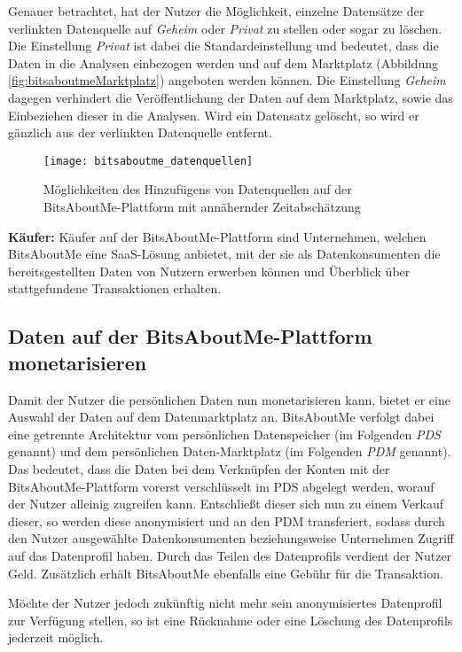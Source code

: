 \noindent Genauer betrachtet, hat der Nutzer die Möglichkeit, einzelne Datensätze der verlinkten Datenquelle auf \textit{Geheim} oder \textit{Privat} zu stellen oder sogar zu löschen. Die Einstellung \textit{Privat} ist dabei die Standardeinstellung und bedeutet, dass die Daten in die Analysen einbezogen werden und auf dem Marktplatz (Abbildung \ref{fig:bitsaboutmeMarktplatz}) angeboten werden können. Die Einstellung \textit{Geheim} dagegen verhindert die Veröffentlichung der Daten auf dem Marktplatz, sowie das Einbeziehen dieser in die Analysen. Wird ein Datensatz gelöscht, so wird er gänzlich aus der verlinkten Datenquelle entfernt.

\begin{figure}[!ht]
	\centering
	\texttt{[image: bitsaboutme\_datenquellen]}
	\caption{Möglichkeiten des Hinzufügens von Datenquellen auf der BitsAboutMe-Plattform mit annähernder Zeitabschätzung}
	\label{fig:bitsaboutmeDatenquellen}
\end{figure}
\FloatBarrier

\noindent \textbf{Käufer:} Käufer auf der BitsAboutMe-Plattform sind Unternehmen, welchen BitsAboutMe eine SaaS-Lösung anbietet, mit der sie als Datenkonsumenten die bereitsgestellten Daten von Nutzern erwerben können und Überblick über stattgefundene Transaktionen erhalten.

\subsection{Daten auf der BitsAboutMe-Plattform monetarisieren}
Damit der Nutzer die persönlichen Daten nun monetarisieren kann, bietet er eine Auswahl der Daten auf dem Datenmarktplatz an. BitsAboutMe verfolgt dabei eine getrennte Architektur vom persönlichen Datenspeicher (im Folgenden \textit{PDS} genannt) und dem persönlichen Daten-Marktplatz (im Folgenden \textit{PDM} genannt). Das bedeutet, dass die Daten bei dem Verknüpfen der Konten mit der BitsAboutMe-Plattform vorerst verschlüsselt im PDS abgelegt werden, worauf der Nutzer alleinig zugreifen kann. Entschließt dieser sich nun zu einem Verkauf dieser, so werden diese anonymisiert und an den PDM transferiert, sodass durch den Nutzer ausgewählte Datenkonsumenten beziehungsweise Unternehmen Zugriff auf das Datenprofil haben. Durch das Teilen des Datenprofils verdient der Nutzer Geld. Zusätzlich erhält BitsAboutMe ebenfalls eine Gebühr für die Transaktion.\newline

\noindent Möchte der Nutzer jedoch zukünftig nicht mehr sein anonymisiertes Datenprofil zur Verfügung stellen, so ist eine Rücknahme oder eine Löschung des Datenprofils jederzeit möglich. \newline

